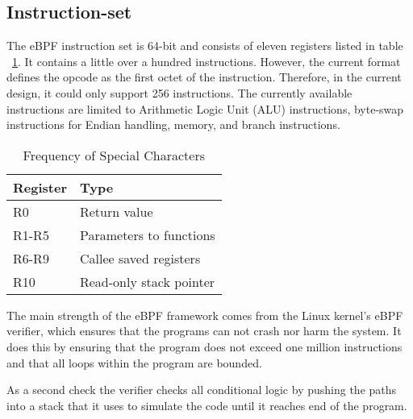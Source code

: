 \documentclass[sigconf, nonacm]{acmart}
\begin{document}
\subsection{Instruction-set}

The eBPF instruction set is 64-bit and consists of eleven registers listed in
table ~\ref{table:eBPF_registers}. It contains a little over a hundred
instructions. However, the current format defines the opcode as the first octet
of the instruction. Therefore, in the current design, it could only support 256
instructions. The currently available instructions are limited to Arithmetic
Logic Unit (ALU) instructions, byte-swap instructions for Endian handling,
memory, and branch instructions.

\begin{table}
  \caption{Frequency of Special Characters}
  \label{tab:freq}
  \begin{tabular}{ll}
    \toprule
    Register & Type                    \\
    \midrule
    R0       & Return value            \\
    R1-R5    & Parameters to functions \\
    R6-R9    & Callee saved registers  \\
    R10      & Read-only stack pointer \\
    \bottomrule
\end{tabular}
\label{table:eBPF_registers}
\end{table}

The main strength of the eBPF framework comes from the Linux kernel's eBPF
verifier, which ensures that the programs can not crash nor harm the system. It
does this by ensuring that the program does not exceed one million instructions
and that all loops within the program are bounded.

As a second check the verifier checks all conditional logic by pushing the paths
into a stack that it uses to simulate the code until it reaches end of the
program.
\end{document}

